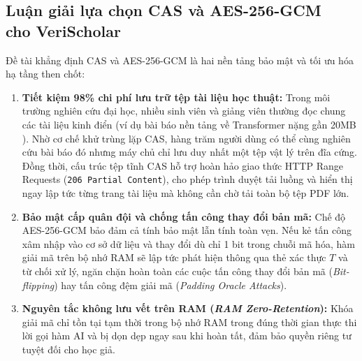 \subsection[Luận giải lựa chọn CAS và AES-256-GCM cho VeriScholar]{Luận giải lựa chọn CAS và AES-256-GCM\\cho VeriScholar}
\label{subsec:luan_giai_cas_byok}
Đề tài khẳng định CAS và AES-256-GCM là hai nền tảng bảo mật và tối ưu hóa hạ tầng then chốt:
\begin{enumerate}[label=\textbf{(\arabic*)}]
    \item \textbf{Tiết kiệm 98\% chi phí lưu trữ tệp tài liệu học thuật:} Trong môi trường nghiên cứu đại học, nhiều sinh viên và giảng viên thường đọc chung các tài liệu kinh điển (ví dụ bài báo nền tảng về Transformer nặng gần 20MB \cite{vaswani2017}). Nhờ cơ chế khử trùng lặp CAS, hàng trăm người dùng có thể cùng nghiên cứu bài báo đó nhưng máy chủ chỉ lưu duy nhất một tệp vật lý trên đĩa cứng. Đồng thời, cấu trúc tệp tĩnh CAS hỗ trợ hoàn hảo giao thức HTTP Range Requests (\texttt{206 Partial Content}), cho phép trình duyệt tải luồng và hiển thị ngay lập tức từng trang tài liệu mà không cần chờ tải toàn bộ tệp PDF lớn.
    \item \textbf{Bảo mật cấp quân đội và chống tấn công thay đổi bản mã:} Chế độ AES-256-GCM bảo đảm cả tính bảo mật lẫn tính toàn vẹn. Nếu kẻ tấn công xâm nhập vào cơ sở dữ liệu và thay đổi dù chỉ 1 bit trong chuỗi mã hóa, hàm giải mã trên bộ nhớ RAM sẽ lập tức phát hiện thông qua thẻ xác thực $T$ và từ chối xử lý, ngăn chặn hoàn toàn các cuộc tấn công thay đổi bản mã (\textit{Bit-flipping}) hay tấn công đệm giải mã (\textit{Padding Oracle Attacks}).
    \item \textbf{Nguyên tắc không lưu vết trên RAM (\textit{RAM Zero-Retention}):} Khóa giải mã chỉ tồn tại tạm thời trong bộ nhớ RAM trong đúng thời gian thực thi lời gọi hàm AI và bị dọn dẹp ngay sau khi hoàn tất, đảm bảo quyền riêng tư tuyệt đối cho học giả.
\end{enumerate}
